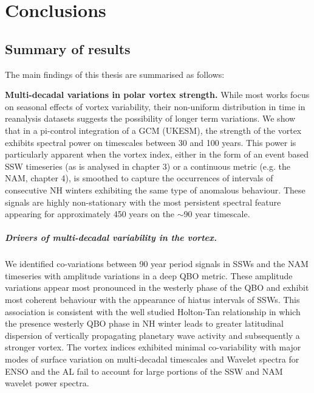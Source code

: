 \chapter{Conclusions}
\label{cha:conclusions}

\section{Summary of results}

The main findings of this thesis are summarised as follows: 

\textbf{Multi-decadal variations in polar vortex strength.}
While most works focus on seasonal effects of vortex variability, their non-uniform distribution in time in reanalysis datasets suggests the possibility of longer term variations. We show that in a pi-control integration of a GCM (UKESM), the strength of the vortex exhibits spectral power on timescales between 30 and 100 years. This power is particularly apparent when the vortex index, either in the form of an event based SSW timeseries (as is analysed in chapter 3) or a continuous metric (e.g. the NAM, chapter 4), is smoothed to capture the occurrences of intervals of consecutive NH winters exhibiting the same type of anomalous behaviour. These signals are highly non-stationary with the most persistent spectral feature appearing for approximately 450 years on the $\sim$90 year timescale. 

\paragraph{Drivers of multi-decadal variability in the vortex.}
We identified co-variations between 90 year period signals in SSWs and the NAM timeseries with amplitude variations in a deep QBO metric. These amplitude variations appear most pronounced in the westerly phase of the QBO and exhibit most coherent behaviour with the appearance of hiatus intervals of SSWs. This association is consistent with the well studied Holton-Tan relationship in which the presence westerly QBO phase in NH winter leads to greater latitudinal dispersion of vertically propagating planetary wave activity and subsequently a stronger vortex. The vortex indices exhibited minimal co-variability with major modes of surface variation on multi-decadal timescales and Wavelet spectra for ENSO and the AL fail to account for large portions of the SSW and NAM wavelet power spectra.

